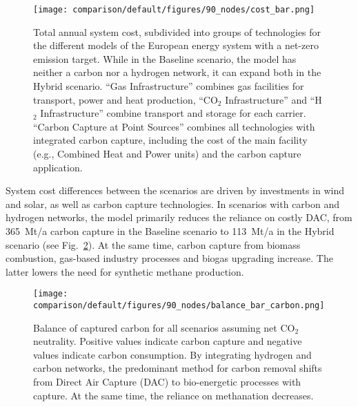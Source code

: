 \documentclass[twocolumn]{article}
\newcommand{\carbon}{CO$_2$}
\newcommand{\hydrogen}{H$_2$}
\newcommand{\baselinescenario}{Baseline scenario}
\newcommand{\hybridscenario}{Hybrid scenario}
\begin{document}
\begin{figure}[ht!]
    \centering
    \texttt{[image: comparison/default/figures/90\_nodes/cost\_bar.png]}
    \caption[short]{Total annual system cost, subdivided into groups of technologies for the different models of the European energy system with a net-zero emission target. While in the \baselinescenario{}, the model has neither a carbon nor a hydrogen network, it can expand both in the \hybridscenario{}. ``Gas Infrastructure'' combines gas facilities for transport, power and heat production, ``\carbon{} Infrastructure'' and ``\hydrogen{} Infrastructure'' combine transport and storage for each carrier. ``Carbon Capture at Point Sources'' combines all technologies with integrated carbon capture, including the cost of the main facility (e.g., Combined Heat and Power units) and the carbon capture application.}
    \label{fig:cost_bar}
\end{figure}


System cost differences between the scenarios are driven by investments in wind and solar, as well as carbon capture technologies. In scenarios with carbon and hydrogen networks, the model primarily reduces the reliance on costly DAC, from 365~Mt/a carbon capture in the \baselinescenario{} to 113~Mt/a in the \hybridscenario{} (see Fig.~\ref{fig:balance_captured_carbon}). At the same time, carbon capture from biomass combustion, gas-based industry processes and biogas upgrading increase. The latter lowers the need for synthetic methane production.

\begin{figure}[ht!]
    \centering
    \texttt{[image: comparison/default/figures/90\_nodes/balance\_bar\_carbon.png]}
    \caption{Balance of captured carbon for all scenarios assuming net \carbon{} neutrality. Positive values indicate carbon capture and negative values indicate carbon consumption. By integrating hydrogen and carbon networks, the predominant method for carbon removal shifts from Direct Air Capture (DAC) to bio-energetic processes with capture. At the same time, the reliance on methanation decreases.}
    \label{fig:balance_captured_carbon}
\end{figure}
\end{document}
